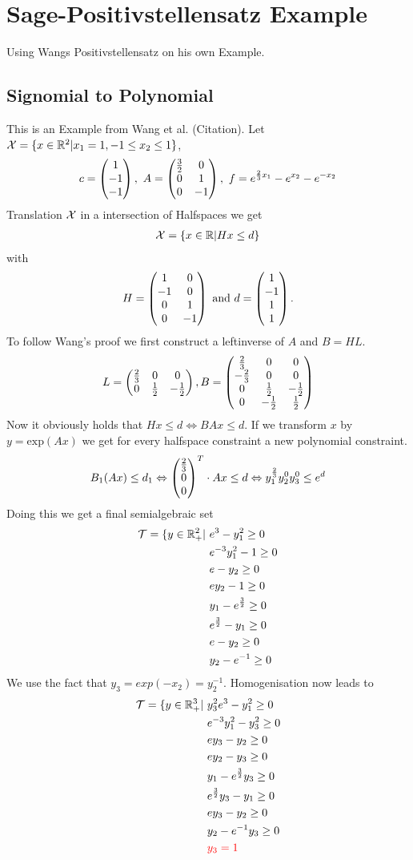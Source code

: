 \documentclass[./main.tex]{subfiles}
\begin{document}
\section{Sage-Positivstellensatz Example}
Using Wangs Positivstellensatz on his own Example.
\subsection{Signomial to Polynomial}
This is an Example from Wang et al. (Citation). Let $\mathcal X = \lbrace x \in \mathbb{R}^2 | x_1 = 1, -1\leq x_2 \leq 1 \rbrace$, 
\begin{equation*}
c = \begin{pmatrix}1\\-1\\-1\end{pmatrix}, \ A =  \begin{pmatrix} \frac 3 2 & 0 \\ 0 & 1 \\ 0 & -1 \end{pmatrix}, \ f=e^{\frac 2 3 x_1} - e^{x_2} - e^{-x_2}
\end{equation*}
Translation $\mathcal{X}$ in a intersection of Halfspaces we get
\begin{align*}
\mathcal{X} = \lbrace x \in \mathbb{R} \vert Hx \leq d \rbrace
\end{align*}
with
\begin{align*}
H =  \begin{pmatrix} 1 & 0 \\ -1 & 0 \\ 0 & 1 \\ 0 & -1 \end{pmatrix} \text{ and } d = \begin{pmatrix}1\\-1\\1\\1\end{pmatrix}.
\end{align*}
To follow Wang's proof we first construct a leftinverse of $A$ and $B=HL$.
\begin{align*}
L = \begin{pmatrix} \frac 2 3 & 0 & 0 \\ 0 & \frac 1 2 & -\frac 1 2 \\ \end{pmatrix}, B = \begin{pmatrix} \frac 2 3 & 0 & 0 \\ -\frac 2 3 & 0 & 0 \\ 0 & \frac 1 2 & -\frac 1 2 \\ 0 & -\frac 1 2 & \frac 1 2 \\ \end{pmatrix}
\end{align*}
Now it obviously holds that $Hx \leq d  \Leftrightarrow BAx \leq d$. If we transform $x$ by $y=\text{exp}(Ax)$ we get for every halfspace constraint a new polynomial constraint.
\begin{align*}
B_1(Ax) \leq d_1 \Leftrightarrow  \begin{pmatrix}\frac 2 3\\0\\0\end{pmatrix}^T  \cdot Ax \leq d \Leftrightarrow y_1^{\frac 2 3}y_2^0y_3^0 \leq e^d
\end{align*}
Doing this we get a final semialgebraic set
\begin{align*}
\mathcal{T} = \lbrace y \in \mathbb{R}^2_+ \vert \ & e^3 - y_1^2 \geq 0 \\
& e^{-3}y_1^2 -1 \geq 0 \\
& e - y_2 \geq 0\\
& ey_2 - 1 \geq 0 \\
& y_1 - e^{\frac 3 2} \geq 0 \\
& e^{\frac 3 2} - y_1 \geq 0 \\
&e- y_2 \geq 0 \\
&y_2 -e^{-1}  \geq 0
\end{align*}
We use the fact that $y_3 = exp(-x_2) = y_2^{-1}.$ Homogenisation now leads to
\begin{align*}
\mathcal{T} = \lbrace y \in \mathbb{R}^3_+ \vert \ & y_3^2e^3 - y_1^2 \geq 0 \\
& e^{-3}y_1^2 -y_3^2 \geq 0 \\
& ey_3 - y_2 \geq 0\\
& ey_2 - y_3 \geq 0 \\
& y_1 - e^{\frac 3 2}y_3 \geq 0 \\
& e^{\frac 3 2}y_3 - y_1 \geq 0 \\
&ey_3- y_2 \geq 0 \\
&y_2 -e^{-1}y_3  \geq 0 \\
&\textcolor{red}{y_3 =  1}
\end{align*}
\end{document}

